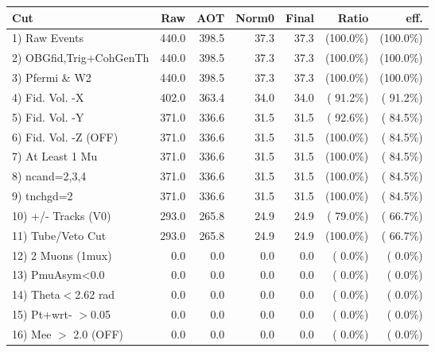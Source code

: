 \begin{table}[h!]\centering
 \begin{tabular}{||l||r|r|r|r|r|r||}
 \hline
 \hline
 Cut & Raw & AOT & Norm0 & Final & Ratio & eff.       \\
 \hline
  1) Raw Events           &        440.0 &        398.5 &         37.3 &         37.3 & (100.0\%) & (100.0\%) \\
  2) OBGfid,Trig+CohGenTh &        440.0 &        398.5 &         37.3 &         37.3 & (100.0\%) & (100.0\%) \\
  3) Pfermi \& W2         &        440.0 &        398.5 &         37.3 &         37.3 & (100.0\%) & (100.0\%) \\
  4) Fid. Vol. -X         &        402.0 &        363.4 &         34.0 &         34.0 & ( 91.2\%) & ( 91.2\%) \\
  5) Fid. Vol. -Y         &        371.0 &        336.6 &         31.5 &         31.5 & ( 92.6\%) & ( 84.5\%) \\
  6) Fid. Vol. -Z (OFF)   &        371.0 &        336.6 &         31.5 &         31.5 & (100.0\%) & ( 84.5\%) \\
  7) At Least 1 Mu        &        371.0 &        336.6 &         31.5 &         31.5 & (100.0\%) & ( 84.5\%) \\
  8) ncand=2,3,4          &        371.0 &        336.6 &         31.5 &         31.5 & (100.0\%) & ( 84.5\%) \\
  9) tnchgd=2             &        371.0 &        336.6 &         31.5 &         31.5 & (100.0\%) & ( 84.5\%) \\
 10) +/- Tracks (V0)      &        293.0 &        265.8 &         24.9 &         24.9 & ( 79.0\%) & ( 66.7\%) \\
 11) Tube/Veto Cut        &        293.0 &        265.8 &         24.9 &         24.9 & (100.0\%) & ( 66.7\%) \\
 12) 2 Muons (1mux)       &          0.0 &          0.0 &          0.0 &          0.0 & (  0.0\%) & (  0.0\%) \\
 13) PmuAsym<0.0          &          0.0 &          0.0 &          0.0 &          0.0 & (  0.0\%) & (  0.0\%) \\
 14) Theta$<$2.62 rad     &          0.0 &          0.0 &          0.0 &          0.0 & (  0.0\%) & (  0.0\%) \\
 15) Pt+wrt- $>$0.05      &          0.0 &          0.0 &          0.0 &          0.0 & (  0.0\%) & (  0.0\%) \\
 16) Mee $>$ 2.0  (OFF)   &          0.0 &          0.0 &          0.0 &          0.0 & (  0.0\%) & (  0.0\%) \\

\end{tabular}
\end{table}
